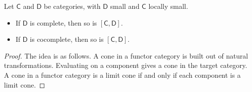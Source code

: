 \documentclass[notes.tex]{subfiles}
\begin{document}
\begin{theorem}
  Let $\mathsf{C}$ and $\mathsf{D}$ be categories, with $\mathsf{D}$ small and $\mathsf{C}$ locally small.
  \begin{itemize}
    \item If $\mathsf{D}$ is complete, then so is $[\mathsf{C}, \mathsf{D}]$.

    \item If $\mathsf{D}$ is cocomplete, then so is $[\mathsf{C}, \mathsf{D}]$.
  \end{itemize}
\end{theorem}
\begin{proof}
  The idea is as follows. A cone in a functor category is built out of natural transformations. Evaluating on a component gives a cone in the target category. A cone in a functor category is a limit cone if and only if each component is a limit cone.
\end{proof}
\end{document}
